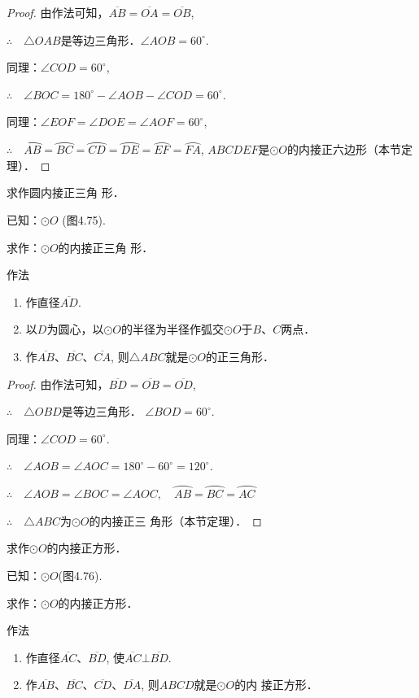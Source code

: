 \begin{proof}
由作法可知，$\overline{AB}=\overline{OA}=\overline{OB}$, 

$\therefore\quad \triangle OAB$是等边三角形．$\angle AOB=60^{\circ}$.

同理：$\angle COD=60^{\circ}$,

$\therefore\quad \angle BOC=180^{\circ}-\angle AOB-\angle COD=60^{\circ}$.

同理：$\angle EOF=\angle DOE=\angle AOF=60^{\circ}$, 

$\therefore\quad \wideparen{AB}=\wideparen{BC}=\wideparen{CD}=\wideparen{DE}=\wideparen{EF}=\wideparen{FA}$,
$ABCDEF$是$\odot O$的内接正六边形（本节定理）．
\end{proof}

\begin{example}
  求作圆内接正三角
  形．

  已知：$\odot O$ (图4.75).

  求作：$\odot O$的内接正三角
  形．

  作法
\begin{enumerate}
  \item 作直径$\overline{AD}$.
  \item 以$D$为圆心，以$\odot O$的半径为半径作弧交$\odot O$于$B$、$C$两点．
  \item 作$\overline{AB}$、$\overline{BC}$、$\overline{CA}$, 则$\triangle ABC$就是$\odot O$的正三角形．
\end{enumerate}
\end{example}

\begin{proof}
  由作法可知，$\overline{BD}=\overline{OB}=\overline{OD}$,

$\therefore\quad  \triangle OBD$是等边三角形． $\angle BOD=60^{\circ}$.

  同理：$\angle COD=60^{\circ}$.

$\therefore\quad \angle AOB=\angle AOC=180^{\circ}-60^{\circ}=120^{\circ}$.

$\therefore\quad \angle AOB=\angle BOC=\angle AOC,\quad \wideparen{AB}=\wideparen{BC}=\wideparen{AC}$

$\therefore\quad \triangle ABC$为$\odot O$的内接正三
  角形（本节定理）．
\end{proof}

\begin{example}
  求作$\odot O$的内接正方形．

  已知：$\odot O$(图4.76).
  
  求作：$\odot O$的内接正方形．

  作法
\begin{enumerate}
  \item 作直径$\overline{AC}$、$\overline{BD}$, 使$\overline{AC}\bot \overline{BD}$.
  \item 作$\overline{AB}$、$\overline{BC}$、$\overline{CD}$、$\overline{DA}$, 则$ABCD$就是$\odot O$的内
  接正方形．
\end{enumerate}
\end{example}

